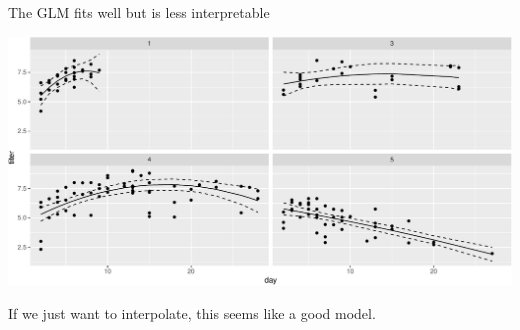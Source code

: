 \documentclass[
  ignorenonframetext,
]{beamer}
\begin{document}
\begin{frame}{The GLM fits well but is less interpretable}
\protect\hypertarget{the-glm-fits-well-but-is-less-interpretable}{}

\includegraphics{intro_Bayes_files/figure-beamer/unnamed-chunk-25-1.pdf}

If we just want to interpolate, this seems like a good model.

\end{frame}
\end{document}
